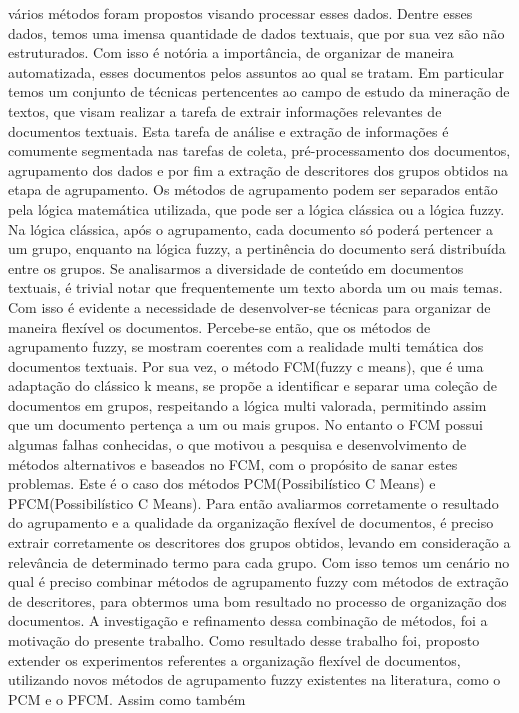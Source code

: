 vários métodos foram propostos visando processar esses dados. Dentre esses dados, temos uma imensa
quantidade de dados textuais, que por sua vez são não estruturados. Com isso é notória a importância,
de organizar de maneira automatizada, esses documentos pelos assuntos ao qual se tratam. Em particular temos um conjunto de técnicas pertencentes ao campo de estudo da mineração de textos, que visam realizar a tarefa de extrair informações relevantes de documentos textuais. Esta tarefa de análise e extração de informações é 
comumente segmentada nas tarefas de coleta, pré-processamento dos documentos, agrupamento dos dados
e por fim a extração de descritores dos grupos obtidos na etapa de agrupamento. Os métodos de agrupamento podem ser separados então pela lógica matemática utilizada, que pode ser a lógica clássica ou a lógica fuzzy. Na lógica clássica, após o agrupamento, cada documento só poderá pertencer a um grupo, enquanto na lógica fuzzy, a pertinência do documento será distribuída entre os grupos. 
Se analisarmos a diversidade de conteúdo em documentos textuais, é trivial notar que frequentemente
um texto aborda um ou mais temas. Com isso é evidente a necessidade de desenvolver-se técnicas para
organizar de maneira flexível os documentos. Percebe-se então, que os métodos de agrupamento fuzzy,
se mostram coerentes com a realidade multi temática dos documentos textuais. Por sua vez, o método FCM(fuzzy c means), que é uma adaptação do clássico k means, se propõe a identificar e separar uma coleção de documentos em grupos, respeitando a lógica multi valorada, permitindo assim que um documento pertença a um ou mais grupos. No entanto o FCM possui algumas falhas conhecidas, o que motivou a pesquisa e desenvolvimento de métodos alternativos e baseados no FCM, com o propósito de sanar estes problemas. Este é o caso dos métodos PCM(Possibilístico C Means) e PFCM(Possibilístico C Means). 
Para então avaliarmos corretamente o resultado do agrupamento e a qualidade da organização flexível 
de documentos, é preciso extrair corretamente os descritores dos grupos obtidos, levando em 
consideração a relevância de determinado termo para cada grupo. Com isso temos um cenário no qual é 
preciso combinar métodos de agrupamento fuzzy com métodos de extração de descritores, para obtermos
uma bom resultado no processo de organização dos documentos. A investigação e refinamento dessa 
combinação de métodos, foi a motivação do presente trabalho. Como resultado desse trabalho foi,
proposto extender os experimentos referentes a organização flexível de documentos, utilizando
novos métodos de agrupamento fuzzy existentes na literatura, como o PCM e o PFCM. Assim como também 
